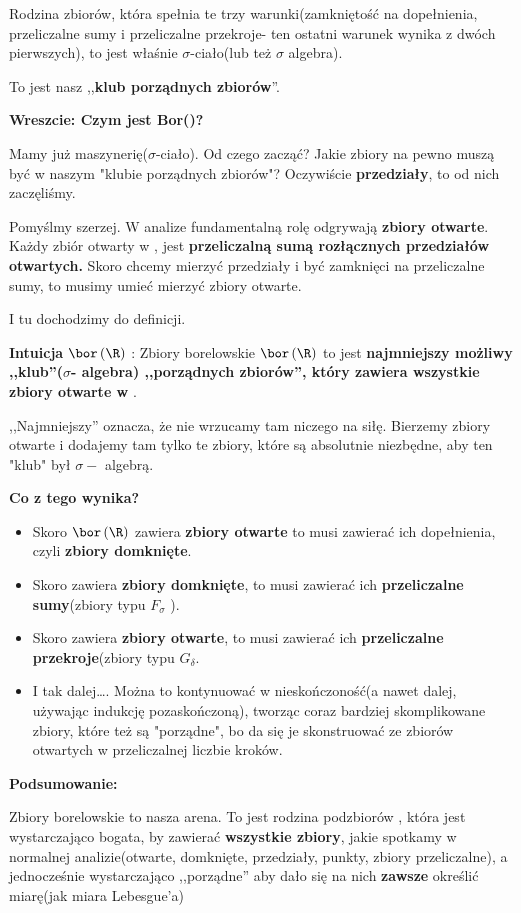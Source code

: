 \begin{remark}
	Rodzina zbiorów, która spełnia te trzy warunki(zamkniętość na dopełnienia, przeliczalne sumy i przeliczalne przekroje- ten ostatni warunek wynika z dwóch pierwszych), to jest właśnie $\sigma$-ciało(lub też $\sigma$ algebra).

	To jest nasz ,,\textbf{klub porządnych zbiorów}''.

	\textbf{Wreszcie: Czym jest Bor(\R)?}

	Mamy już maszynerię($\sigma$-ciało). Od czego zacząć? Jakie zbiory na pewno muszą być w naszym "klubie porządnych zbiorów"? Oczywiście \textbf{przedziały}, to od nich zaczęliśmy.

Pomyślmy szerzej. W analize fundamentalną rolę odgrywają \textbf{zbiory otwarte}. Każdy zbiór otwarty w \R, jest \textbf{przeliczalną sumą rozłącznych przedziałów otwartych.} Skoro chcemy mierzyć przedziały i być zamknięci na przeliczalne sumy, to musimy umieć mierzyć zbiory otwarte.

I tu dochodzimy do definicji.

\textbf{Intuicja } $\bor\left(\R\right) $ : Zbiory borelowskie $\bor\left(\R\right) $ to jest \textbf{najmniejszy możliwy ,,klub''($\sigma$- algebra) ,,porządnych zbiorów'', który zawiera wszystkie zbiory otwarte w \R}.

,,Najmniejszy'' oznacza, że nie wrzucamy tam niczego na siłę. Bierzemy zbiory otwarte i dodajemy tam tylko te zbiory, które są absolutnie niezbędne, aby ten "klub" był $\sigma-$ algebrą.

\textbf{Co z tego wynika?}
\begin{itemize}
	\item Skoro $\bor\left(\R\right) $ zawiera \textbf{zbiory otwarte} to musi zawierać ich dopełnienia, czyli \textbf{zbiory domknięte}.
	\item Skoro zawiera \textbf{zbiory domknięte}, to musi zawierać ich \textbf{przeliczalne sumy}(zbiory typu $F_{\sigma}$ ).  
	\item Skoro zawiera \textbf{zbiory otwarte}, to musi zawierać ich \textbf{przeliczalne przekroje}(zbiory typu $G_{\delta}$.
	\item I tak dalej\ldots. Można to kontynuować w nieskończoność(a nawet dalej, używając indukcję pozaskończoną), tworząc coraz bardziej skomplikowane zbiory, które też są "porządne", bo da się je skonstruować ze zbiorów otwartych w przeliczalnej liczbie kroków.
\end{itemize}

\textbf{Podsumowanie:}

Zbiory borelowskie to nasza arena. To jest rodzina podzbiorów \R, która jest wystarczająco bogata, by zawierać \textbf{wszystkie zbiory}, jakie spotkamy w normalnej analizie(otwarte, domknięte, przedziały, punkty, zbiory przeliczalne), a jednocześnie wystarczająco ,,porządne'' aby dało się na nich \textbf{zawsze} określić miarę(jak miara Lebesgue'a)
\end{remark} 

